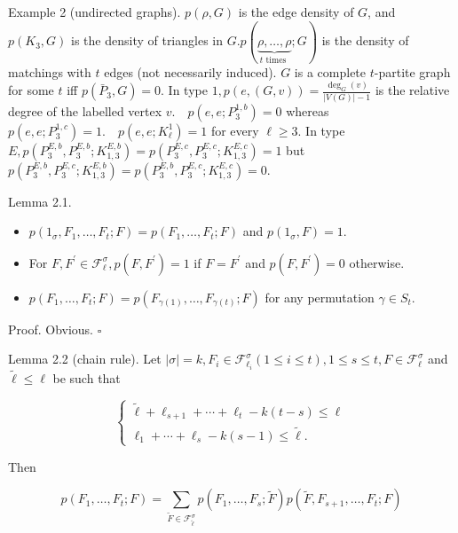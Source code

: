 \documentclass[10pt]{article}
\begin{document}
Example 2 (undirected graphs). $p(\rho, G)$ is the edge density of $G$, and $p\left(K_{3}, G\right)$ is the density of triangles in $G . p(\underbrace{\rho, \ldots, \rho}_{t \text { times }} ; G)$ is the density of matchings with $t$ edges (not necessarily induced). $G$ is a complete $t$-partite graph for some $t$ iff $p\left(\bar{P}_{3}, G\right)=0$. In type $1, p(e,(G, v))=\frac{\operatorname{deg}_{G}(v)}{|V(G)|-1}$ is the relative degree of the labelled vertex $v . \quad p\left(e, e ; P_{3}^{1, b}\right)=0$ whereas $p\left(e, e ; P_{3}^{1, c}\right)=1 . \quad p\left(e, e ; K_{\ell}^{1}\right)=1$ for every $\ell \geq 3$. In type $E, p\left(P_{3}^{E, b}, P_{3}^{E, b} ; K_{1,3}^{E, b}\right)=p\left(P_{3}^{E, c}, P_{3}^{E, c} ; K_{1,3}^{E, c}\right)=1$ but $p\left(P_{3}^{E, b}, P_{3}^{E, c} ; K_{1,3}^{E, b}\right)=p\left(P_{3}^{E, b}, P_{3}^{E, c} ; K_{1,3}^{E, c}\right)=0$.

Lemma 2.1.

\begin{itemize}
  \item[a)] $p\left(1_{\sigma}, F_{1}, \ldots, F_{t} ; F\right)=p\left(F_{1}, \ldots, F_{t} ; F\right)$ and $p\left(1_{\sigma}, F\right)=1$.
  \item[b)] For $F, F^{\prime} \in \mathcal{F}_{\ell}^{\sigma}, p\left(F, F^{\prime}\right)=1$ if $F=F^{\prime}$ and $p\left(F, F^{\prime}\right)=0$ otherwise.
  \item[c)] $p\left(F_{1}, \ldots, F_{t} ; F\right)=p\left(F_{\gamma(1)}, \ldots, F_{\gamma(t)} ; F\right)$ for any permutation $\gamma \in S_{t}$.
\end{itemize}

Proof. Obvious. \(\square\)

Lemma 2.2 (chain rule). Let $|\sigma|=k, F_{i} \in \mathcal{F}_{\ell_{i}}^{\sigma}(1 \leq i \leq t), 1 \leq s \leq t, F \in \mathcal{F}_{\ell}^{\sigma}$ and $\tilde{\ell} \leq \ell$ be such that

\[
\left\{\begin{array}{l}
\tilde{\ell}+\ell_{s+1}+\cdots+\ell_{t}-k(t-s) \leq \ell  \tag{2}\\
\ell_{1}+\cdots+\ell_{s}-k(s-1) \leq \tilde{\ell} .
\end{array}\right.
\]

Then

$$
p\left(F_{1}, \ldots, F_{t} ; F\right)=\sum_{\widetilde{F} \in \mathcal{F}_{\tilde{\ell}}^{\sigma}} p\left(F_{1}, \ldots, F_{s} ; \widetilde{F}\right) p\left(\widetilde{F}, F_{s+1}, \ldots, F_{t} ; F\right)
$$
\end{document}
